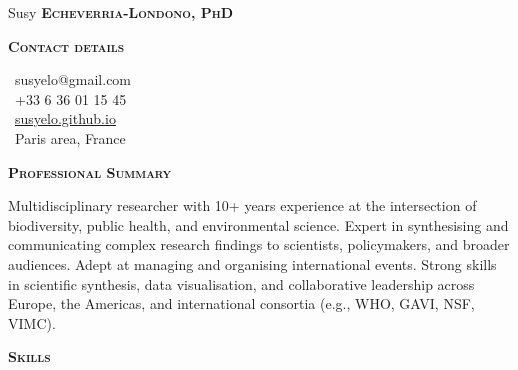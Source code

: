 \documentclass[10pt, a4paper]{article}
\newcommand{\headleft}[1]{\vspace*{3ex}\textsc{\textbf{#1}}\par%
    \vspace*{-1.5ex}\hrulefill\par\vspace*{0.7ex}}
\begin{document}
\setlength{\topskip}{0pt}
\setlength{\parindent}{0pt}
\setlength{\parskip}{0pt}
\setlength{\fboxsep}{0pt}
\pagestyle{empty}
\raggedbottom

\begin{minipage}[t]{0.33\textwidth} %
\colorbox{cvblue}{\begin{minipage}[t][5mm][t]{\textwidth}\null\hfill\null\end{minipage}}

\vspace{-.2ex} %
\colorbox{cvblue!90}{\color{white}  %
\textwidth\relax%
\begin{minipage}[t][293mm][t]{0.82\textwidth}
\raggedright
\vspace*{2.5ex}

\Large Susy \textbf{\textsc{Echeverria-Londono, PhD}} \normalsize 


\headleft{Contact details}
\small %
\MVAt\ {\small susyelo@gmail.com} \\[0.4ex]
\Mobilefone\ +33 6 36 01 15 45 \\[0.5ex]
\Mundus\ \href{https://susyelo.github.io/}{susyelo.github.io} \\[0.1ex]
\Letter\ Paris area, France
\normalsize

\vspace*{0.5ex} %

\headleft{Professional Summary}
Multidisciplinary researcher with 10+ years experience at the intersection of biodiversity, public health, and environmental science. Expert in synthesising and communicating complex research findings to scientists, policymakers, and broader audiences. Adept at managing and organising international events. Strong skills in scientific synthesis, data visualisation, and collaborative leadership across Europe, the Americas, and international consortia (e.g., WHO, GAVI, NSF, VIMC).

\headleft{Skills}
\begin{itemize}


\end{itemize}
\end{minipage}}
\end{minipage}
\end{document}
